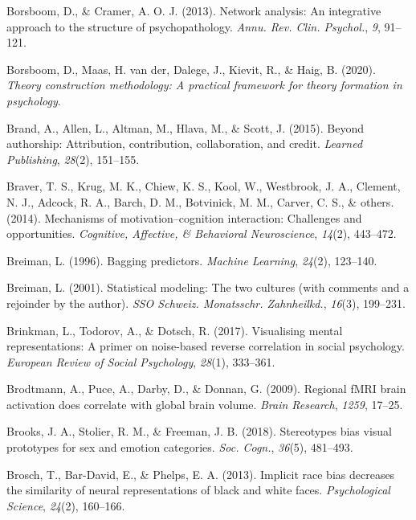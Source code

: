 \documentclass[11pt,american,a4paper,oneside,]{memoir} %
\begin{document}
\leavevmode\hypertarget{ref-Borsboom2013-wb}{}%
Borsboom, D., \& Cramer, A. O. J. (2013). Network analysis: An integrative approach to the structure of psychopathology. \emph{Annu. Rev. Clin. Psychol.}, \emph{9}, 91--121.

\leavevmode\hypertarget{ref-Borsboom2020-xg}{}%
Borsboom, D., Maas, H. van der, Dalege, J., Kievit, R., \& Haig, B. (2020). \emph{Theory construction methodology: A practical framework for theory formation in psychology}.

\leavevmode\hypertarget{ref-brand2015beyond}{}%
Brand, A., Allen, L., Altman, M., Hlava, M., \& Scott, J. (2015). Beyond authorship: Attribution, contribution, collaboration, and credit. \emph{Learned Publishing}, \emph{28}(2), 151--155.

\leavevmode\hypertarget{ref-braver2014mechanisms}{}%
Braver, T. S., Krug, M. K., Chiew, K. S., Kool, W., Westbrook, J. A., Clement, N. J., Adcock, R. A., Barch, D. M., Botvinick, M. M., Carver, C. S., \& others. (2014). Mechanisms of motivation--cognition interaction: Challenges and opportunities. \emph{Cognitive, Affective, \& Behavioral Neuroscience}, \emph{14}(2), 443--472.

\leavevmode\hypertarget{ref-breiman1996bagging}{}%
Breiman, L. (1996). Bagging predictors. \emph{Machine Learning}, \emph{24}(2), 123--140.

\leavevmode\hypertarget{ref-Breiman2001-lf}{}%
Breiman, L. (2001). Statistical modeling: The two cultures (with comments and a rejoinder by the author). \emph{SSO Schweiz. Monatsschr. Zahnheilkd.}, \emph{16}(3), 199--231.

\leavevmode\hypertarget{ref-Brinkman2017-hg}{}%
Brinkman, L., Todorov, A., \& Dotsch, R. (2017). Visualising mental representations: A primer on noise-based reverse correlation in social psychology. \emph{European Review of Social Psychology}, \emph{28}(1), 333--361.

\leavevmode\hypertarget{ref-brodtmann2009regional}{}%
Brodtmann, A., Puce, A., Darby, D., \& Donnan, G. (2009). Regional fMRI brain activation does correlate with global brain volume. \emph{Brain Research}, \emph{1259}, 17--25.

\leavevmode\hypertarget{ref-Brooks2018-ao}{}%
Brooks, J. A., Stolier, R. M., \& Freeman, J. B. (2018). Stereotypes bias visual prototypes for sex and emotion categories. \emph{Soc. Cogn.}, \emph{36}(5), 481--493.

\leavevmode\hypertarget{ref-brosch2013implicit}{}%
Brosch, T., Bar-David, E., \& Phelps, E. A. (2013). Implicit race bias decreases the similarity of neural representations of black and white faces. \emph{Psychological Science}, \emph{24}(2), 160--166.
\end{document}

